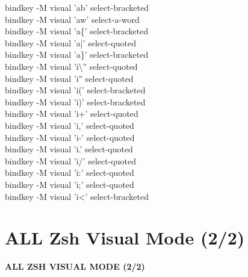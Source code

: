 \documentclass[11pt,a4paper,twoside]{book}
\begin{document}
bindkey -M visual 'ab' select-bracketed\\
bindkey -M visual 'aw' select-a-word\\
bindkey -M visual 'a\{' select-bracketed\\
bindkey -M visual 'a|' select-quoted\\
bindkey -M visual 'a\}' select-bracketed\\
bindkey -M visual 'i\textbackslash{}'' select-quoted\\
bindkey -M visual 'i'' select-quoted\\
bindkey -M visual 'i(' select-bracketed\\
bindkey -M visual 'i)' select-bracketed\\
bindkey -M visual 'i+' select-quoted\\
bindkey -M visual 'i,' select-quoted\\
bindkey -M visual 'i-' select-quoted\\
bindkey -M visual 'i.' select-quoted\\
bindkey -M visual 'i/' select-quoted\\
bindkey -M visual 'i:' select-quoted\\
bindkey -M visual 'i;' select-quoted\\
bindkey -M visual 'i<' select-bracketed\\


\vspace{16pt}

\section{ALL Zsh Visual Mode (2/2)}


\vspace{10pt}
{\large\bfseries\color{neoncyan} ALL ZSH VISUAL MODE (2/2)}\vspace{6pt}
\end{document}
